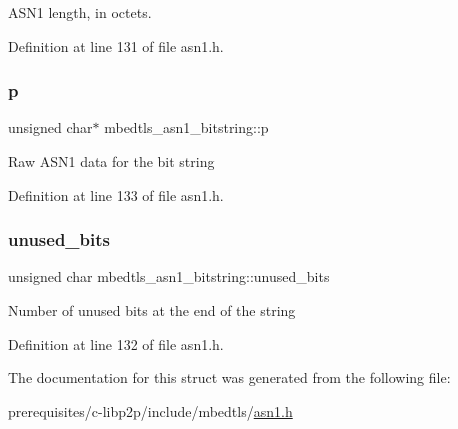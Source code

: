 A\+S\+N1 length, in octets. 

Definition at line 131 of file asn1.\+h.

\mbox{\label{structmbedtls__asn1__bitstring_af09328f8b1a8cb5bf4afae369ce3629c}} 
\subsubsection{\texorpdfstring{p}{p}}
{\footnotesize\ttfamily unsigned char$\ast$ mbedtls\+\_\+asn1\+\_\+bitstring\+::p}

Raw A\+S\+N1 data for the bit string 

Definition at line 133 of file asn1.\+h.

\mbox{\label{structmbedtls__asn1__bitstring_aca26541c9ecb384ef2d5c2ca6a05a25b}} 
\subsubsection{\texorpdfstring{unused\+\_\+bits}{unused\_bits}}
{\footnotesize\ttfamily unsigned char mbedtls\+\_\+asn1\+\_\+bitstring\+::unused\+\_\+bits}

Number of unused bits at the end of the string 

Definition at line 132 of file asn1.\+h.



The documentation for this struct was generated from the following file\+:\begin{DoxyCompactItemize}
\item 
prerequisites/c-\/libp2p/include/mbedtls/\mbox{\hyperlink{asn1_8h}{asn1.\+h}}\end{DoxyCompactItemize}
